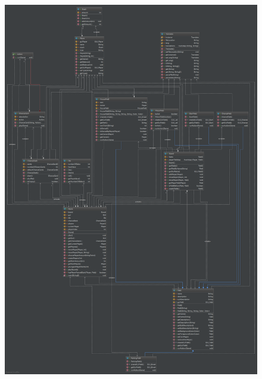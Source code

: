 \begin{figure}[H]
    \begin{center}
        \includegraphics[width=\columnwidth]{graphics/domain/class_diagram.png}
    \end{center}
\end{figure}